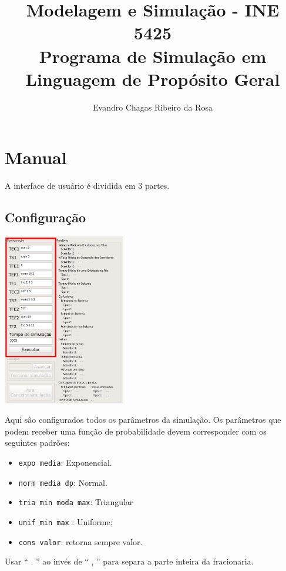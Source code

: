 \documentclass{article}
\title{Modelagem e Simulação - INE 5425\\
Programa de Simulação em Linguagem de Propósito Geral}
\author{Evandro Chagas Ribeiro da Rosa}
\begin{document}
\maketitle

\section{Manual}
A interface de usuário é dividida em 3 partes.

\subsection{Configuração}
\begin{multicols}{2}
  \includegraphics[width=0.4\textwidth]{imgs/conf.png}
\columnbreak

Aqui são configurados todos os parâmetros da simulação. Os parâmetros que podem receber uma
  função de probabilidade devem corresponder com os seguintes padrões:
\begin{itemize}
  \item \texttt{expo media}: Exponencial.
  \item \texttt{norm media dp}: Normal.
  \item \texttt{tria min moda max}: Triangular
  \item \texttt{unif min max} : Uniforme;
  \item \texttt{cons valor}: retorna sempre valor.
\end{itemize}
Usar `` . '' ao invés  de `` , '' para separa a parte inteira da fracionaria.
\end{multicols}
\end{document}
